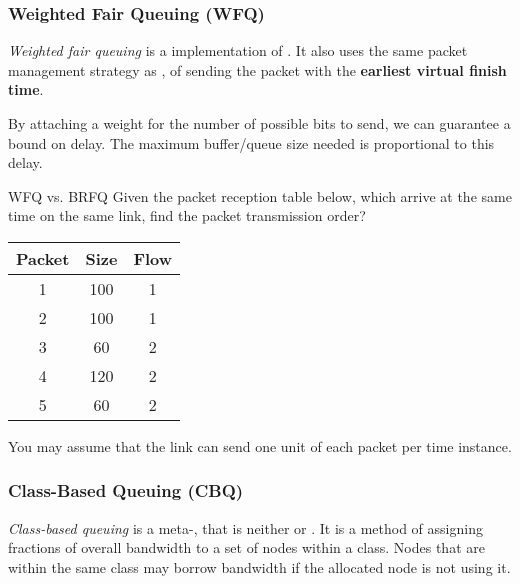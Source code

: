 \subsubsection{Weighted Fair Queuing (WFQ)}\label{subsubsec:Weighted_Fair_Queuing}
\begin{definition}\label{def:Weighted_Fair_Queuing}
  \emph{Weighted fair queuing} is a  implementation of .
  It also uses the same packet management strategy as , of sending the packet with the \textbf{earliest virtual finish time}.

  By attaching a weight for the number of possible bits to send, we can guarantee a bound on delay.
  The maximum buffer/queue size needed is proportional to this delay.
\end{definition}

\begin{example}[Lecture 5]{WFQ vs. BRFQ}
  Given the packet reception table below, which arrive at the same time on the same link, find the packet transmission order?
  \begin{tabular}{ccc}
    \toprule
    Packet & Size & Flow \\
    \midrule
    1 & 100 & 1 \\
    2 & 100 & 1 \\
    3 & 60 & 2 \\
    4 & 120 & 2 \\
    5 & 60 & 2 \\
    \bottomrule
  \end{tabular}

  You may assume that the link can send one unit of each packet per time instance.
  \tcblower{}
\end{example}

\subsubsection{Class-Based Queuing (CBQ)}\label{subsubsec:Class_Based_Queuing}
\begin{definition}\label{def:Class_Based_Queuing}
  \emph{Class-based queuing} is a meta-, that is neither  or .
  It is a method of assigning fractions of overall bandwidth to a set of nodes within a class.
  Nodes that are within the same class may borrow bandwidth if the allocated node is not using it.
\end{definition}

